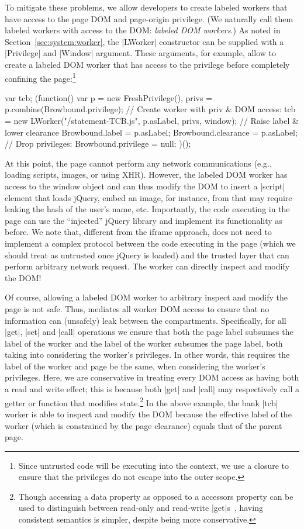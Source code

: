 To mitigate these problems, we allow developers to create labeled workers that
have access to the page DOM and page-origin privilege.
%
(We naturally call them labeled workers with access to the DOM:
\emph{labeled DOM workers}.)
%
As noted in Section~\ref{sec:system:worker}, the \js|LWorker|
constructor can be supplied with a \js|Privilege| and \js|Window|
argument.
%
These arguments, for example, allow  to create a labeled DOM
worker that has access to the  privilege before completely
confining the page:\footnote{
  Since untrusted code will be executing into the context, we use a
  closure to ensure that the privileges do not escape into the outer
  scope.
}
\begin{jscode}
var tcb;
(function() {
  var p = new FreshPrivilege(),
      privs = p.combine(Browbound.privilege);
  // Create worker with priv & DOM access:
  tcb = new LWorker("/statement-TCB.js",
                    p.asLabel, privs, window);
  // Raise label & lower clearance
  Browbound.label = p.asLabel;
  Browbound.clearance = p.asLabel;
  // Drop privileges:
  Browbound.privilege = null;
})();
\end{jscode}
%
At this point, the page cannot perform any network communications
(e.g., loading scripts, images, or using XHR).
%
However, the labeled DOM worker has access to the window object and
can thus modify the DOM to insert a \js|script| element that loads
jQuery, embed an image, for instance, from  that
may require leaking the hash of the user's name, etc.
%
Importantly, the code executing in the page can use the ``injected''
jQuery library and implement its functionality as before.
%
We note that, different from the iframe approach,  does not 
need to implement a complex protocol between the code executing in the
page (which we should treat as untrusted once jQuery is loaded) and
the trusted layer that can perform arbitrary network request.
%
The worker can directly inspect and modify the DOM!

Of course, allowing a labeled DOM worker to arbitrary inspect and
modify the page is not safe.
%
Thus, \sys{} mediates all worker DOM access to ensure that no information can
(unsafely) leak between the compartments.
%
Specifically, for all \js|get|, \js|set| and \js|call| operations we
ensure that both the page label subsumes the label of the worker 
and the label of the worker subsumes the page label,
both taking into considering the worker's privileges.
%
In other words, this requires the label of the worker and page be the same,
when considering the worker's privileges.
%
Here, we are conservative in treating every DOM access as
having both a read and write effect;
%
this is because both \js|get| and \js|call| may respectively call a getter or
function that modifies state.\footnote{
Though accessing a data property as opposed to a accessors property
can be used to distinguish between read-only and read-write
\js|get|s~\cite{ecma}, having consistent semantics is simpler,
despite being more conservative.
}
%
In the above example, the bank \js|tcb| worker is able to inspect and modify
the DOM because the effective label of the worker (which is constrained by the
page clearance) equals that of the parent page.
%


